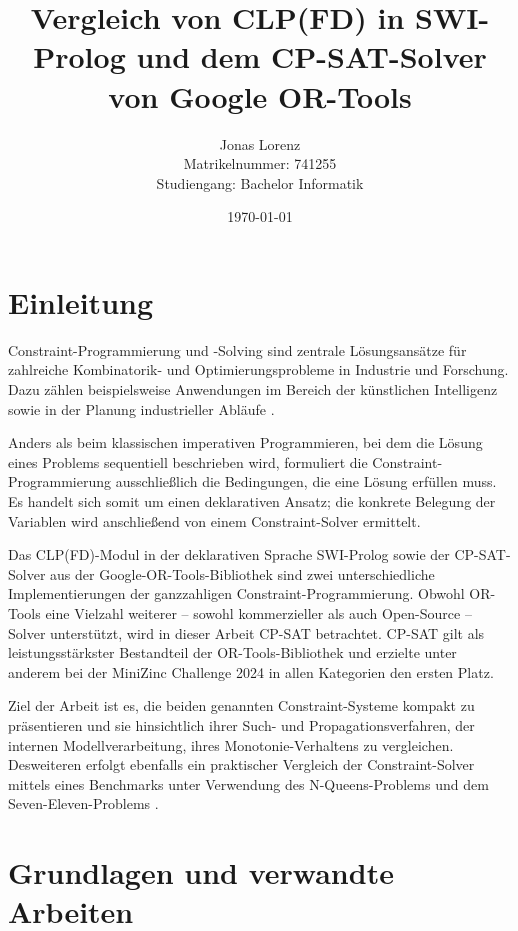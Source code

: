 \documentclass[12pt,a4paper]{article}
\title{Vergleich von CLP(FD) in SWI-Prolog und dem CP-SAT-Solver von Google OR-Tools}
\author{Jonas Lorenz\\Matrikelnummer: 741255\\Studiengang: Bachelor Informatik}
\date{\today}
\begin{document}
\maketitle
\thispagestyle{empty}

\newpage

\tableofcontents
\thispagestyle{empty}
\newpage


\section{Einleitung}
\label{sec:einleitung}
Constraint-Programmierung und -Solving sind zentrale Lösungsansätze für zahlreiche Kombinatorik- und Optimierungsprobleme in Industrie und Forschung.
Dazu zählen beispielsweise Anwendungen im Bereich der künstlichen Intelligenz \cite{popescu2022} sowie in der Planung industrieller Abläufe \cite{clp_book}.

Anders als beim klassischen imperativen Programmieren, bei dem die Lösung eines Problems sequentiell beschrieben wird, formuliert die Constraint-Programmierung ausschließlich die Bedingungen, die eine Lösung erfüllen muss.
Es handelt sich somit um einen deklarativen Ansatz; die konkrete Belegung der Variablen wird anschließend von einem Constraint-Solver ermittelt.

Das CLP(FD)-Modul in der deklarativen Sprache SWI-Prolog sowie der CP-SAT-Solver aus der Google-OR-Tools-Bibliothek sind zwei unterschiedliche Implementierungen der ganzzahligen Constraint-Programmierung.
Obwohl OR-Tools eine Vielzahl weiterer -- sowohl kommerzieller als auch Open-Source -- Solver unterstützt, wird in dieser Arbeit CP-SAT betrachtet.
CP-SAT gilt als leistungsstärkster Bestandteil der OR-Tools-Bibliothek und erzielte unter anderem bei der MiniZinc Challenge 2024 \cite{minizinc2024,perron} in allen Kategorien den ersten Platz.

Ziel der Arbeit ist es, die beiden genannten Constraint-Systeme kompakt zu präsentieren und sie hinsichtlich ihrer Such- und Propagationsverfahren, der internen Modellverarbeitung, ihres Monotonie-Verhaltens zu vergleichen.
Desweiteren erfolgt ebenfalls ein praktischer Vergleich der Constraint-Solver mittels eines Benchmarks unter Verwendung des N-Queens-Problems \cite{nqueens} und dem Seven-Eleven-Problems \cite{seven_eleven}. 

\section{Grundlagen und verwandte Arbeiten}
\end{document}

